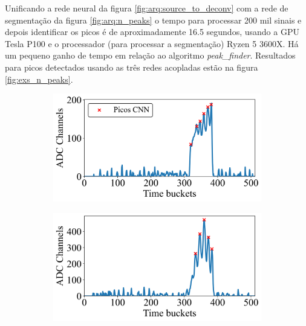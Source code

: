 \documentclass[a4paper,12pt,oneside]{book}
\begin{document}
\par Unificando a rede neural da figura \ref{fig:arq:source_to_deconv} com a rede de segmentação da figura \ref{fig:arq:n_peaks} o tempo para processar 200 mil sinais e depois identificar os picos é de aproximadamente 16.5 segundos, usando a GPU Tesla P100 e o processador (para processar a segmentação) Ryzen 5 3600X. Há um pequeno ganho de tempo em relação ao algoritmo \textit{peak\_finder}. Resultados para picos detectados usando as três redes acopladas estão na figura \ref{fig:exs_n_peaks}.

\begin{figure}[H]
\centering
    \begin{subfigure}[b]{0.49\textwidth}
        \centering
        \includegraphics[scale=0.425]{figs/np_exs1.png}
        \caption{}
        \label{subfig:exs_n_peaks_1}
    \end{subfigure}%
    \hfill
    \begin{subfigure}[b]{0.465\textwidth}
        \centering
        \includegraphics[scale=0.425]{figs/np_exs2.png}
        \caption{}
        \label{subfig:exs_n_peaks_2}
    \end{subfigure}
    \begin{subfigure}[b]{0.49\textwidth}

\end{subfigure}
\end{figure}
\end{document}
